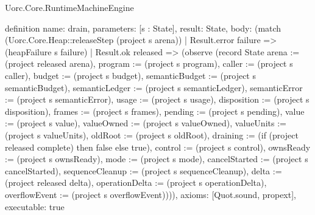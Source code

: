 \begin{lexlean}{Uorc.Core.RuntimeMachineEngine}
\begin{semanticmodule}
definition{
  name: drain,
  parameters: [s : State],
  result: State,
  body: (match (Uorc.Core.Heap::releaseStep (project s arena))
    | Result.error failure => (heapFailure s failure)
    | Result.ok released => (observe (record State {arena := (project released arena), program := (project s program), caller := (project s caller), budget := (project s budget), semanticBudget := (project s semanticBudget), semanticLedger := (project s semanticLedger), semanticError := (project s semanticError), usage := (project s usage), disposition := (project s disposition), frames := (project s frames), pending := (project s pending), value := (project s value), valueOwned := (project s valueOwned), valueUnits := (project s valueUnits), oldRoot := (project s oldRoot), draining := (if (project released complete) then false else true), control := (project s control), ownsReady := (project s ownsReady), mode := (project s mode), cancelStarted := (project s cancelStarted), sequenceCleanup := (project s sequenceCleanup), delta := (project released delta), operationDelta := (project s operationDelta), overflowEvent := (project s overflowEvent)}))),
  axioms: [Quot.sound, propext],
  executable: true
}


\end{semanticmodule}
\end{lexlean}
